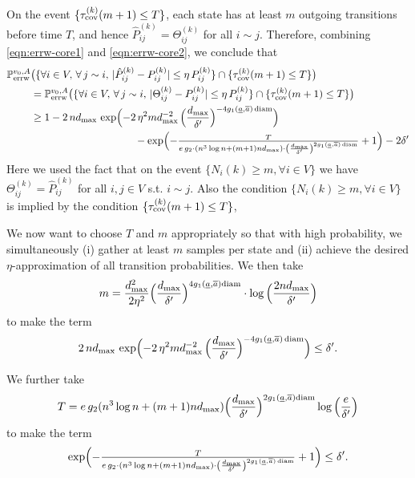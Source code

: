 \documentclass[a4paper, 11pt]{article}
\renewcommand{\P}{\mathbb{P}}
\newcommand{\Perrw}{\P_{\textnormal{errw}}}
\newcommand{\diam}{\textnormal{diam}}
\newcommand{\cov}{\textnormal{cov}}
\begin{document}
On the event \(\{\tau_\cov^{(k)}(m+1)\le T\}\), each state has at least \(m\) outgoing transitions before time \(T\), and hence \(\hat P_{ij}^{(k)}=\Theta_{ij}^{(k)}\) for all \(i\sim j\). Therefore, combining \cref{eqn:errw-core1} and \cref{eqn:errw-core2}, we conclude that
\begin{align}
\label{eqn:errw-core3}
\Perrw^{v_0,A} & \bigl( \{\forall i\in V,\,\forall\,j\sim i,\, \lvert \hat{P}_{ij}^{(k)} - P_{ij}^{(k)}\rvert \le\eta \, P_{ij}^{(k)}\}\cap \{\tau_\cov^{(k)}(m+1)\leq T\}\bigr)\nonumber\\
& = \Perrw^{v_0,A} \bigl( \{\forall i\in V,\,\forall\,j\sim i,\, \lvert \Theta_{ij}^{(k)} - P_{ij}^{(k)}\rvert \le\eta \, P_{ij}^{(k)}\}\cap \{\tau_\cov^{(k)}(m+1)\leq T\}\bigr)\nonumber \\
& \geq 1 - 2\,nd_{\max} \,\exp\Bigl(-2\,\eta^2 m 
      d_{\max}^{-2}\,\Big(\frac{d_{\max}}{\delta'}\Big)^{-4g_1(\underline{a},\overline{a})\,\diam}  \Bigr) \nonumber\\
& \hspace{10em} - \exp\Bigl(-\tfrac{T}{e\,g_2\cdot(n^3\log n + (m+1)nd_{\max})\cdot \left( \frac{d_{\max}}{\delta'}\right)^{2g_1(\underline{a},\overline{a})\,\diam}}+1\Bigr) - 2\delta'
\end{align}
Here we used the fact that on the event $\{N_i(k)\geq m, \forall i\in V\}$ we have $\Theta_{ij}^{(k)} = \hat{P}_{ij}^{(k)}$ for all $i,j\in V$ s.t. $i\sim j$. Also the condition $\{N_i(k)\geq m, \forall i\in V\}$ is implied by the condition
$\{\tau_\cov^{(k)}(m+1)\leq T\}$,

We now want to choose \(T\) and \(m\) appropriately 
so that with high probability, we simultaneously (i) gather at least $m$ samples per state and (ii) achieve the desired \(\eta\)-approximation of all transition probabilities. We then take 
\[m=\frac{d_{\max}^2}{2 \eta^2}\Big(\frac{d_{\max}}{\delta'}\Big)^{4g_1(\underline{a},\overline{a})\diam}\cdot\log\Big(\frac{2nd_{\max}}{\delta'}\Big)\]
to make the term 
\[2\,n d_{\max} \,\exp\Bigl(-2\,\eta^2 m d_{\max}^{-2}\,\Big(\frac{d_{\max}}{\delta'}\Big)^{-4g_1(\underline{a},\overline{a})\,\diam}  \Bigr)\leq \delta'.\]

We further take
\begin{align*}
T 
&= e\,g_2(n^3\log n +(m+1)nd_{\max})\Big(\frac{d_{\max}}{\delta'}\Big)^{2g_1(\underline{a},\overline{a})\diam}\log\Big(\frac{e}{\delta'}\Big)\\
\end{align*}
to make the term
\[\exp\Bigl(-\tfrac{T}{e\,g_2\cdot(n^3\log n + (m+1)nd_{\max})\cdot \left( \frac{d_{\max}}{\delta'}\right)^{2g_1(\underline{a},\overline{a})\,\diam}}+1\Bigr)\leq \delta'.\]
\end{document}

